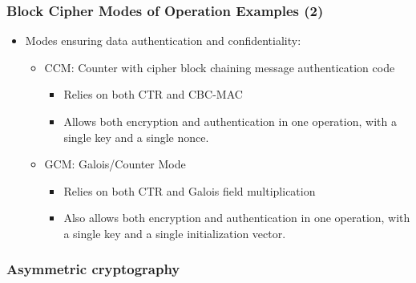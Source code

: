 \begin{frame}
  \frametitle{Block Cipher Modes of Operation Examples (2)}
  \begin{itemize}
    \item Modes ensuring data authentication and confidentiality:
      \begin{itemize}
        \item CCM: Counter with cipher block chaining message authentication code
          \begin{itemize}
            \item Relies on both CTR and CBC-MAC
            \item Allows both encryption and authentication in one
              operation, with a single key and a single nonce.
          \end{itemize}
        \item GCM: Galois/Counter Mode
          \begin{itemize}
            \item Relies on both CTR and Galois field multiplication
            \item Also allows both encryption and authentication in one
              operation, with a single key and a single initialization vector.
          \end{itemize}
      \end{itemize}
  \end{itemize}
\end{frame}

\subsubsection{Asymmetric cryptography}

